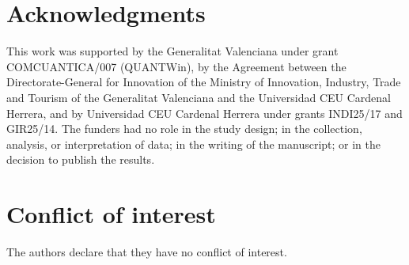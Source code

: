 \documentclass{article}
\numberwithin{equation}{section}
\begin{document}

\section*{Acknowledgments}

This work was supported by the Generalitat Valenciana under grant
COMCUANTICA/007 (QUANTWin), by the Agreement between the Directorate-General for Innovation of the
Ministry of Innovation, Industry, Trade and Tourism of the Generalitat Valenciana and the
Universidad CEU Cardenal Herrera, and by Universidad CEU Cardenal Herrera under grants INDI25/17 and GIR25/14.
The funders had no role in the study design; in the collection, analysis, or interpretation of data; in the writing
of the manuscript; or in the decision to publish the results.



\section*{Conflict of interest}
The authors declare that they have no conflict of interest.
\end{document}
